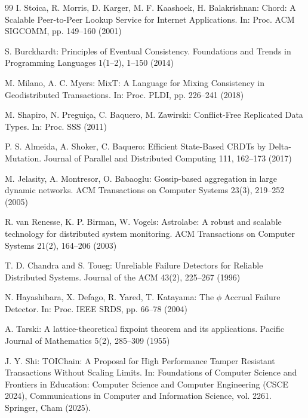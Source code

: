 \documentclass[runningheads]{llncs}
\begin{document}
\begin{thebibliography}{99}
I. Stoica, R. Morris, D. Karger, M. F. Kaashoek, H. Balakrishnan: Chord: A Scalable Peer-to-Peer Lookup Service for Internet Applications. In: Proc. ACM SIGCOMM, pp. 149–160 (2001)

S. Burckhardt: Principles of Eventual Consistency. Foundations and Trends in Programming Languages 1(1–2), 1–150 (2014)

M. Milano, A. C. Myers: MixT: A Language for Mixing Consistency in Geodistributed Transactions. In: Proc. PLDI, pp. 226–241 (2018)

M. Shapiro, N. Preguiça, C. Baquero, M. Zawirski: Conflict-Free Replicated Data Types. In: Proc. SSS (2011)

P. S. Almeida, A. Shoker, C. Baquero: Efficient State-Based CRDTs by Delta-Mutation. Journal of Parallel and Distributed Computing 111, 162–173 (2017)

M. Jelasity, A. Montresor, O. Babaoglu: Gossip-based aggregation in large dynamic networks. ACM Transactions on Computer Systems 23(3), 219–252 (2005)

R. van Renesse, K. P. Birman, W. Vogels: Astrolabe: A robust and scalable technology for distributed system monitoring. ACM Transactions on Computer Systems 21(2), 164–206 (2003)

T. D. Chandra and S. Toueg: Unreliable Failure Detectors for Reliable Distributed Systems. Journal of the ACM 43(2), 225–267 (1996)

N. Hayashibara, X. Defago, R. Yared, T. Katayama: The $\phi$ Accrual Failure Detector. In: Proc. IEEE SRDS, pp. 66–78 (2004)

A. Tarski: A lattice-theoretical fixpoint theorem and its applications. Pacific Journal of Mathematics 5(2), 285–309 (1955)

J. Y. Shi: TOIChain: A Proposal for High Performance Tamper Resistant Transactions Without Scaling Limits. In: Foundations of Computer Science and Frontiers in Education: Computer Science and Computer Engineering (CSCE 2024), Communications in Computer and Information Science, vol. 2261. Springer, Cham (2025).
\end{thebibliography}
\end{document}
